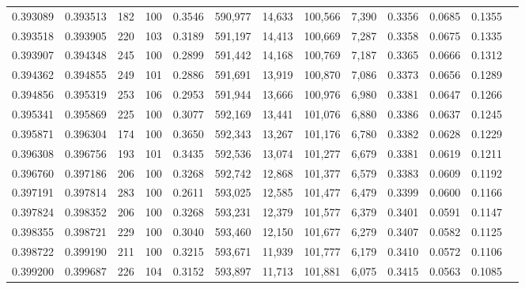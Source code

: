 \begin{tabular}{rrrrrrrrrrrrr}
0.393089 & 0.393513 &   182 & 100 &                                     0.3546 & 590,977 &  14,633 & 100,566 &   7,390 & 0.3356 & 0.0685 & 0.1355 \\
0.393518 & 0.393905 &   220 & 103 &                                     0.3189 & 591,197 &  14,413 & 100,669 &   7,287 & 0.3358 & 0.0675 & 0.1335 \\
0.393907 & 0.394348 &   245 & 100 &                                     0.2899 & 591,442 &  14,168 & 100,769 &   7,187 & 0.3365 & 0.0666 & 0.1312 \\
0.394362 & 0.394855 &   249 & 101 &                                     0.2886 & 591,691 &  13,919 & 100,870 &   7,086 & 0.3373 & 0.0656 & 0.1289 \\
0.394856 & 0.395319 &   253 & 106 &                                     0.2953 & 591,944 &  13,666 & 100,976 &   6,980 & 0.3381 & 0.0647 & 0.1266 \\
0.395341 & 0.395869 &   225 & 100 &                                     0.3077 & 592,169 &  13,441 & 101,076 &   6,880 & 0.3386 & 0.0637 & 0.1245 \\
0.395871 & 0.396304 &   174 & 100 &                                     0.3650 & 592,343 &  13,267 & 101,176 &   6,780 & 0.3382 & 0.0628 & 0.1229 \\
0.396308 & 0.396756 &   193 & 101 &                                     0.3435 & 592,536 &  13,074 & 101,277 &   6,679 & 0.3381 & 0.0619 & 0.1211 \\
0.396760 & 0.397186 &   206 & 100 &                                     0.3268 & 592,742 &  12,868 & 101,377 &   6,579 & 0.3383 & 0.0609 & 0.1192 \\
0.397191 & 0.397814 &   283 & 100 &                                     0.2611 & 593,025 &  12,585 & 101,477 &   6,479 & 0.3399 & 0.0600 & 0.1166 \\
0.397824 & 0.398352 &   206 & 100 &                                     0.3268 & 593,231 &  12,379 & 101,577 &   6,379 & 0.3401 & 0.0591 & 0.1147 \\
0.398355 & 0.398721 &   229 & 100 &                                     0.3040 & 593,460 &  12,150 & 101,677 &   6,279 & 0.3407 & 0.0582 & 0.1125 \\
0.398722 & 0.399190 &   211 & 100 &                                     0.3215 & 593,671 &  11,939 & 101,777 &   6,179 & 0.3410 & 0.0572 & 0.1106 \\
0.399200 & 0.399687 &   226 & 104 &                                     0.3152 & 593,897 &  11,713 & 101,881 &   6,075 & 0.3415 & 0.0563 & 0.1085 \\

\end{tabular}
